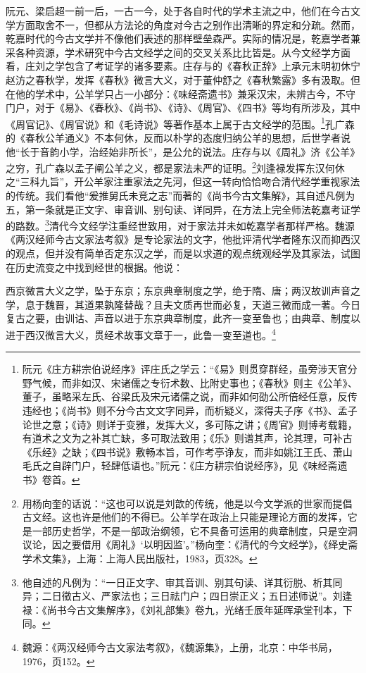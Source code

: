 \documentclass[a4paper, 12pt, openright]{ctexbook}
\renewenvironment{quote}
  {\list{}{\rightmargin2\ccwd \leftmargin2\ccwd \itemindent=2\ccwd \listparindent=2\ccwd}%
   \item\relax\small\kaishu\color{black}}
  {\endlist}
\begin{document}
阮元、梁启超一前一后，一古一今，处于各自时代的学术主流之中，他们在今古文学方面取舍不一，但都从方法论的角度对今古之别作出清晰的界定和分疏。然而，乾嘉时代的今古文学并不像他们表述的那样壁垒森严。实际的情况是，乾嘉学者兼采各种资源，学术研究中今古文经学之间的交叉关系比比皆是。从今文经学方面看，庄刘之学包含了考证学的诸多要素。庄存与的《春秋正辞》上承元末明初休宁赵汸之春秋学，发挥《春秋》微言大义，对于董仲舒之《春秋繁露》多有汲取。但在他的学术中，公羊学只占一小部分：《味经斋遗书》兼采汉宋，未辨古今，不守门户，对于《易》、《春秋》、《尚书》、《诗》、《周官》、《四书》等均有所涉及，其中《周官记》、《周官说》和《毛诗说》等著作基本上属于古文经学的范围。\footnote{阮元《庄方耕宗伯说经序》评庄氏之学云：“《易》则贯穿群经，虽旁涉天官分野气候，而非如汉、宋诸儒之专衍术数、比附史事也；《春秋》则主《公羊》、董子，虽略采左氏、谷梁氏及宋元诸儒之说，而非如何劭公所倍经任意，反传违经也；《尚书》则不分今古文文字同异，而析疑义，深得夫子序《书》、孟子论世之意；《诗》则详于变雅，发挥大义，多可陈之讲；《周官》则博考载籍，有道术之文为之补其亡缺，多可取法致用；《乐》则谱其声，论其理，可补古《乐经》之缺；《四书说》敷畅本旨，可作考亭诤友，而非如姚江王氏、萧山毛氏之自辟门户，轻肆低语也。”阮元：《庄方耕宗伯说经序》，见《味经斋遗书》卷首。}孔广森的《春秋公羊通义》不本何休，反而以朴学的态度归纳公羊的思想，后世学者说他“长于音韵小学，治经始非所长”，是公允的说法。庄存与以《周礼》济《公羊》之穷，孔广森以孟子阐公羊之义，都是家法未严的证明。\footnote{用杨向奎的话说：“这也可以说是刘歆的传统，他是以今文学派的世家而提倡古文经。这也许是他们的不得已。公羊学在政治上只能是理论方面的发挥，它是一部历史哲学，不是一部政治纲领，它不具备可运用的典章制度，只是空洞议论，因之要借用《周礼》‘以明因监’。”杨向奎：《清代的今文经学》，《绎史斋学术文集》，上海：上海人民出版社，1983，页328。}刘逢禄发挥东汉何休之“三科九旨”，开公羊家注重家法之先河，但这一转向恰恰吻合清代经学重视家法的传统。我们看他“爰推舅氏未竞之志”而著的《尚书今古文集解》，其自述凡例为五，第一条就是正文字、审音训、别句读、详同异，在方法上完全师法乾嘉考证学的路数。\footnote{他自述的凡例为：“一日正文字、审其音训、别其句读、详其衍脱、析其同异；二日徵古义、严家法也；三日祛门户；四日崇正义；五日述师说”。刘逢禄：《尚书今古文集解序》，《刘礼部集》卷九，光绪壬辰年延晖承堂刊本，下同。}清代今文经学注重经世致用，对于家法并未如乾嘉学者那样严格。魏源《两汉经师今古文家法考叙》是专论家法的文字，他批评清代学者隆东汉而抑西汉的观点，但并没有简单否定东汉之学，而是以求道的观点统观经学及其家法，试图在历史流变之中找到经世的根据。他说：

\begin{quote}
西京微言大义之学，坠于东京；东京典章制度之学，绝于隋、唐；两汉故训声音之学，息于魏晋，其道果孰隆替哉？且夫文质再世而必复，天道三微而成一著。今日复古之要，由训诂、声音以进于东京典章制度，此齐一变至鲁也；由典章、制度以进于西汉微言大义，贯经术故事文章于一，此鲁一变至道也。\footnote{魏源：《两汉经师今古文家法考叙》，《魏源集》，上册，北京：中华书局，1976，页152。}
\end{quote}
\end{document}
